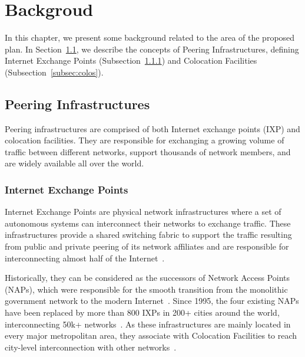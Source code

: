 \chapter{Backgroud}\label{cap:background}
\thispagestyle{empty}

	In this chapter, we present some background related to the area of the proposed plan. In Section~\ref{sec:peering-infra}, we describe the concepts of Peering Infrastructures, defining Internet Exchange Points (Subsection~\ref{subsec:ixp}) and Colocation Facilities (Subsection~\ref{subsec:colos}).


	\section{Peering Infrastructures}
	\label{sec:peering-infra}

	Peering infrastructures are comprised of both Internet exchange points (IXP) and colocation facilities. They are responsible for exchanging a growing volume of traffic between different networks, support thousands of network members, and are widely available all over the world.

	\subsection{Internet Exchange Points}
	\label{subsec:ixp}

	Internet Exchange Points are physical network infrastructures where a set of autonomous systems can interconnect their networks to exchange traffic. These infrastructures provide a shared switching fabric to support the traffic resulting from public and private peering of its network affiliates and are responsible for interconnecting almost half of the Internet~\cite{Ager:2012, Chatzis:2013:BUL:2504730.2504746, Richter:2014}.

	Historically, they can be considered as the successors of Network Access Points (NAPs), which were responsible for the smooth transition from the monolithic government network to the modern Internet~\cite{Chatzis:2013}. Since 1995, the four existing NAPs have been replaced by more than 800 IXPs in 200+ cities around the world, interconnecting 50k+ networks~\cite{Ager:2012, Giotsas:2015:MPI:2716281.2836122}. As these infrastructures are mainly located in every major metropolitan area, they associate with Colocation Facilities to reach city-level interconnection with other networks~\cite{Giotsas:2015:MPI:2716281.2836122}.

